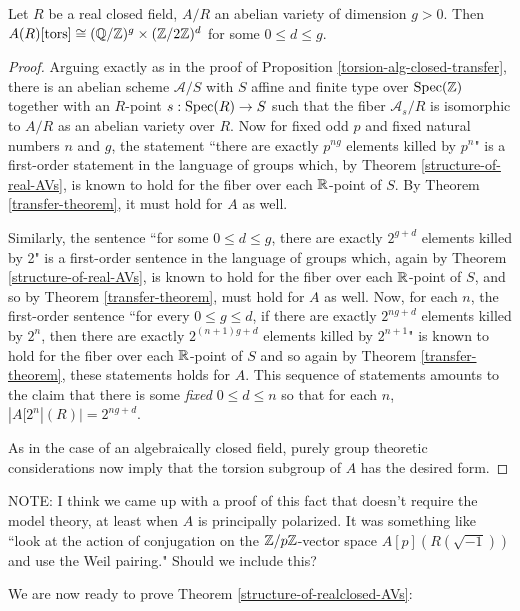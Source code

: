 \begin{proposition}
\label{torsion-prop-real-closed}
Let $R$ be a real closed field, $A/R$ an abelian variety of dimension $g>0$. Then $A(R)[\operatorname{tors}]\cong (\mathbb{Q}/\mathbb{Z})^g\times (\mathbb{Z}/2\mathbb{Z})^d$ for some $0\leq d\leq g$.
\end{proposition}
\begin{proof}
Arguing exactly as in the proof of Proposition \ref{torsion-alg-closed-transfer}, there is an abelian scheme $\mathcal{A}/S$ with $S$ affine and finite type over $\operatorname{Spec}(\mathbb{Z})$ together with an $R$-point $s:\operatorname{Spec}(R)\rightarrow S$ such that the fiber $\mathcal{A}_s/R$ is isomorphic to $A/R$ as an abelian variety over $R$. Now for fixed odd $p$ and fixed natural numbers $n$ and $g$, the statement ``there are exactly $p^{ng}$ elements killed by $p^n$" is a first-order statement in the language of groups which, by Theorem \ref{structure-of-real-AVs}, is known to hold for the fiber over each $\mathbb{R}$-point of $S$. By Theorem \ref{transfer-theorem}, it must hold for $A$ as well. 

Similarly, the sentence ``for some $0\leq d\leq g$, there are exactly $2^{g+d}$ elements killed by 2" is a first-order sentence in the language of groups which, again by Theorem \ref{structure-of-real-AVs}, is known to hold for the fiber over each $\mathbb{R}$-point of $S$, and so by Theorem \ref{transfer-theorem}, must hold for $A$ as well. Now, for each $n$, the first-order sentence ``for every $0\leq g\leq d$, if there are exactly $2^{ng+d}$ elements killed by $2^n$, then there are exactly $2^{(n+1)g+d}$ elements killed by $2^{n+1}$" is known to hold for the fiber over each $\mathbb{R}$-point of $S$ and so again by Theorem \ref{transfer-theorem}, these statements holds for $A$. This sequence of statements amounts to the claim that there is some \emph{fixed} $0\leq d \leq n$ so that for each $n$, $|A[2^n|(R)|=2^{ng+d}$. 

As in the case of an algebraically closed field, purely group theoretic considerations now imply that the torsion subgroup of $A$ has the desired form.
\end{proof}

NOTE: I think we came up with a proof of this fact that doesn't require the model theory, at least when $A$ is principally polarized. It was something like ``look at the action of conjugation on the $\mathbb{Z}/p\mathbb{Z}$-vector space $A[p](R(\sqrt{-1}))$ and use the Weil pairing." Should we include this?

We are now ready to prove Theorem \ref{structure-of-realclosed-AVs}:

